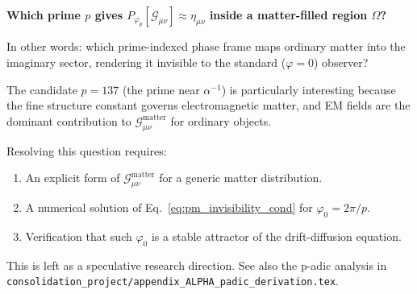 \begin{tcolorbox}[colback=yellow!5!white,colframe=yellow!75!black,title=Open Question (SPECULATIVE)]
\textbf{Which prime $p$ gives $P_{\varphi_p}[\mathcal{G}_{\mu\nu}] \approx \eta_{\mu\nu}$
inside a matter-filled region $\Omega$?}

In other words: which prime-indexed phase frame maps ordinary matter into the imaginary sector,
rendering it invisible to the standard ($\varphi = 0$) observer?

The candidate $p = 137$ (the prime near $\alpha^{-1}$) is particularly interesting because the
fine structure constant governs electromagnetic matter, and EM fields are the dominant contribution
to $\mathcal{G}_{\mu\nu}^\mathrm{matter}$ for ordinary objects.
\end{tcolorbox}

Resolving this question requires:
\begin{enumerate}
  \item An explicit form of $\mathcal{G}_{\mu\nu}^\mathrm{matter}$ for a generic matter distribution.
  \item A numerical solution of Eq.~\eqref{eq:pm_invisibility_cond} for $\varphi_0 = 2\pi/p$.
  \item Verification that such $\varphi_0$ is a stable attractor of the drift-diffusion equation.
\end{enumerate}

This is left as a speculative research direction.  See also the p-adic analysis in
\texttt{consolidation\_project/appendix\_ALPHA\_padic\_derivation.tex}.

